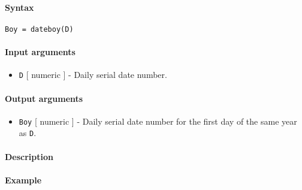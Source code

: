 


	\paragraph{Syntax}

\begin{verbatim}
Boy = dateboy(D)
\end{verbatim}

\paragraph{Input arguments}

\begin{itemize}
\itemsep1pt\parskip0pt
\item
  \texttt{D} {[} numeric {]} - Daily serial date number.
\end{itemize}

\paragraph{Output arguments}

\begin{itemize}
\itemsep1pt\parskip0pt
\item
  \texttt{Boy} {[} numeric {]} - Daily serial date number for the first
  day of the same year as \texttt{D}.
\end{itemize}

\paragraph{Description}

\paragraph{Example}



